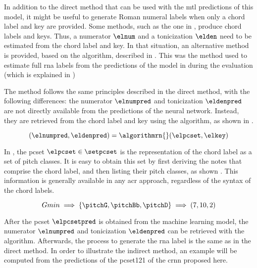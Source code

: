 
In addition to the direct method that can be used with the
\gls{mtl} predictions of this model, it might be useful to
generate Roman numeral labels when only a chord label and
key are provided. Some methods, such as the one in
\textcite{mcleod2021modular}, produce chord labels and keys.
Thus, a numerator $\elnum$ and a tonicization $\elden$ need
to be estimated from the chord label and key. In that
situation, an alternative method is provided, based on the
\algorithmrn{} algorithm, described in
.
This was the method used to estimate full \gls{rna} labels
from the predictions of the model in
\textcite{mcleod2021modular, chen2021attend} during the
evaluation (which is explained in
)

The method follows the same principles described in the
direct method, with the following differences: the numerator
$\elnumpred$ and tonicization $\eldenpred$ are not directly
available from the predictions of the neural network.
Instead, they are retrieved from the chord label and key
using the \algorithmrn{} algorithm, as shown in
.

\begin{equation}
    \label{eq:calling_natem}
    (\elnumpred, \eldenpred) = \algorithmrn{}(\elpcset, \elkey) 
\end{equation}

In , the \gls{pcset} $\elpcset \in
\setpcset$ is the representation of the chord label as a set
of pitch classes. It is easy to obtain this set by first
deriving the notes that comprise the chord label, and then
listing their pitch classes, as shown
. This information is generally
available in any \gls{acr} approach, regardless of the
syntax of the chord labels.


\begin{equation}
    \label{eq:indirect_method_pcset}
    Gmin \implies \{\pitchG, \pitchBb, \pitchD\} \implies (7, 10, 2)
\end{equation} 

After the \gls{pcset} $\elpcsetpred$ is obtained from the
machine learning model, the numerator $\elnumpred$ and
tonicization $\eldenpred$ can be retrieved with the
\algorithmrn{} algorithm. Afterwards, the process to
generate the \gls{rna} label is the same as in the direct
method. In order to illustrate the indirect method, an
example will be computed from the predictions of the
\gls{pcset121} of the \gls{crnn} proposed here.
